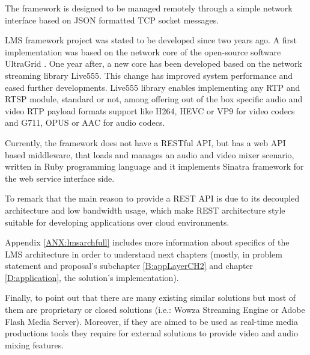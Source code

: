 The framework is designed to be managed remotely through a simple network interface based on JSON formatted TCP socket messages. 

LMS framework project was stated to be developed since two years ago. A first implementation was based on the network core of the open-source software UltraGrid \cite{ug}. One year after, a new core has been developed based on the network streaming library Live555. This change has improved system performance and eased further developments. Live555 library enables implementing any RTP and RTSP module, standard or not, among offering out of the box specific audio and video RTP payload formats support like H264, HEVC or VP9 for video codecs and G711, OPUS or AAC for audio codecs.

Currently, the framework does not have a RESTful API, but has a web API based middleware, that loads and manages an audio and video mixer scenario, written in Ruby programming language and it implements Sinatra framework for the web service interface side.

To remark that the main reason to provide a REST API is due to its decoupled architecture and low bandwidth usage, which make REST architecture style suitable for developing applications over cloud environments.

Appendix \ref{ANX:lmsarchfull} includes more information about specifics of the LMS architecture in order to understand next chapters (mostly, in problem statement and proposal's subchapter \ref{B:appLayerCH2} and chapter \ref{D:application}, the solution's implementation).

Finally, to point out that there are many existing similar solutions but most of them are proprietary or closed solutions (i.e.: Wowza Streaming Engine or Adobe Flash Media Server). Moreover, if they are aimed to be used as real-time media productions tools they require for external solutions to provide video and audio mixing features.
